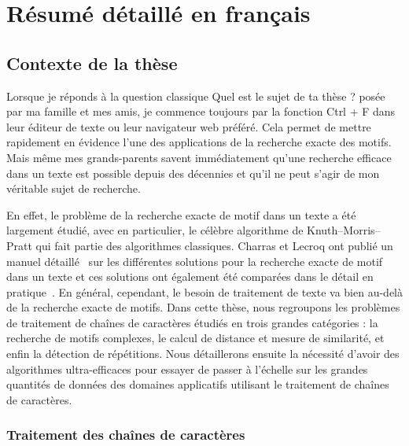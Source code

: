 \chapter*{Résumé détaillé en français}\setcounter{page}{1}


\newpage

\section*{Contexte de la thèse}

Lorsque je réponds à la question classique \og{}Quel est le sujet de ta thèse ?\fg{} posée par ma famille et mes amis, je commence toujours par la fonction \og{}Ctrl + F\fg{} dans leur éditeur de texte ou leur navigateur web préféré. Cela permet de mettre rapidement en évidence l'une des applications de la recherche exacte des motifs.
Mais même mes grands-parents savent immédiatement qu'une recherche efficace dans un texte est possible depuis des décennies et qu'il ne peut s'agir de mon véritable sujet de recherche.

En effet, le problème de la recherche exacte de motif dans un texte a été largement étudié, avec en particulier, le célèbre algorithme de Knuth--Morris--Pratt qui fait partie des algorithmes classiques. Charras et Lecroq ont publié un manuel détaillé~\cite{Charras2004} sur les différentes solutions pour la recherche exacte de motif dans un texte et ces solutions ont également été comparées dans le détail en pratique~\cite{DBLP:journals/corr/abs-1012-2547, faro2013exact}. En général, cependant, le besoin de traitement de texte va bien au-delà de la recherche exacte de motifs. Dans cette thèse, nous regroupons les problèmes de traitement de chaînes de caractères étudiés en trois grandes catégories : la recherche de motifs complexes, le calcul de distance et mesure de similarité, et enfin la détection de répétitions. Nous détaillerons ensuite la nécessité d'avoir des algorithmes ultra-efficaces pour essayer de passer à l'échelle sur les grandes quantités de données des domaines applicatifs utilisant le traitement de chaînes de caractères.

\subsection*{Traitement des chaînes de caractères}


